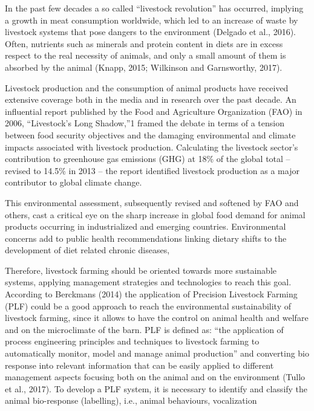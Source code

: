 In the past few decades a so called “livestock revolution” has occurred,
implying a growth in meat consumption worldwide, which led to an increase of waste by livestock systems that pose dangers to the environment (Delgado et al., 2016). Often, nutrients such as minerals and
protein content in diets are in excess respect to the real necessity of animals, and only a small amount of them is absorbed by the animal (Knapp, 2015; Wilkinson and Garnsworthy, 2017). 

Livestock production and the consumption of animal products have
received extensive coverage both in the media and in research over
the past decade. An influential report published by the Food and
Agriculture Organization (FAO) in 2006, “Livestock’s Long Shadow,”1
framed the debate in terms of a tension between food security objectives and the damaging environmental and climate impacts associated with livestock production. Calculating the livestock sector’s contribution to greenhouse gas emissions (GHG) at 18\% of the global total – revised to 14.5\% in 2013 – the report identified livestock production as a major contributor to global climate change. 

This environmental assessment, subsequently revised and softened
by FAO and others, cast a critical eye on the sharp increase in global
food demand for animal products occurring in industrialized and
emerging countries. Environmental concerns add to public health
recommendations linking dietary shifts to the development of diet related chronic diseases,


Therefore, livestock farming should be oriented towards more sustainable
systems, applying management strategies and technologies to
reach this goal. According to Berckmans (2014) the application of Precision
Livestock Farming (PLF) could be a good approach to reach the environmental
sustainability of livestock farming, since it allows to have
the control on animal health and welfare and on the microclimate of
the barn. PLF is defined as: “the application of process engineering principles
and techniques to livestock farming to automatically monitor, model
and manage animal production” and converting bio response into relevant
information that can be easily applied to different management aspects
focusing both on the animal and on the environment (Tullo et al.,
2017). To develop a PLF system, it is necessary to identify and classify the
animal bio-response (labelling), i.e., animal behaviours, vocalization


